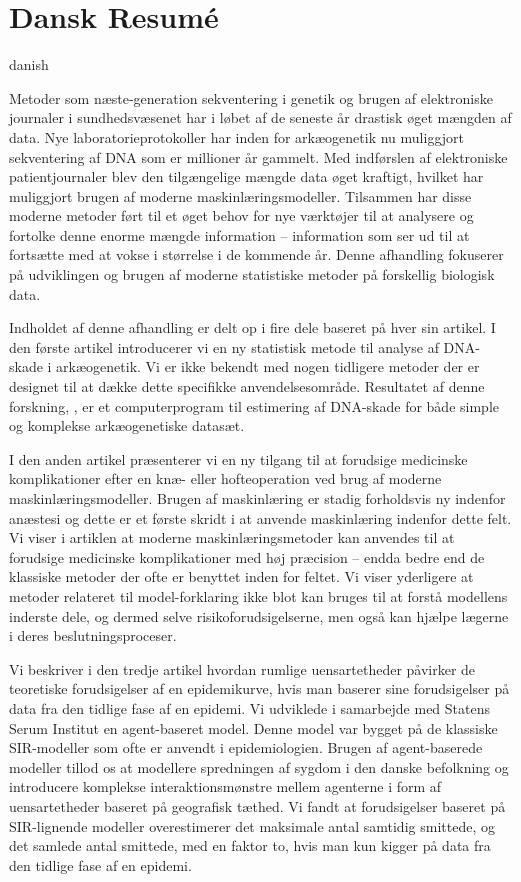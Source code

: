 \chapter{Dansk Resumé}

\begin{otherlanguage*}{danish}


    Metoder som næste-generation sekventering i genetik og brugen af elektroniske journaler i sundhedsvæsenet har i løbet af de seneste år drastisk øget mængden af data. Nye laboratorieprotokoller har inden for arkæogenetik nu muliggjort sekventering af DNA som er millioner år gammelt. Med indførslen af elektroniske patientjournaler blev den tilgængelige mængde data øget kraftigt, hvilket har muliggjort brugen af moderne maskinlæringsmodeller. Tilsammen har disse moderne metoder ført til et øget behov for nye værktøjer til at analysere og fortolke denne enorme mængde information -- information som ser ud til at fortsætte med at vokse i størrelse i de kommende år. Denne afhandling fokuserer på udviklingen og brugen af moderne statistiske metoder på forskellig biologisk data.

    Indholdet af denne afhandling er delt op i fire dele baseret på hver sin artikel. I den første artikel introducerer vi en ny statistisk metode til analyse af DNA-skade i arkæogenetik. Vi er ikke bekendt med nogen tidligere metoder der er designet til at dække dette specifikke anvendelsesområde. Resultatet af denne forskning, \metaDMG, er et computerprogram til estimering af DNA-skade for både simple og komplekse arkæogenetiske datasæt.

    I den anden artikel præsenterer vi en ny tilgang til at forudsige medicinske komplikationer efter en knæ- eller hofteoperation ved brug af moderne maskinlæringsmodeller. Brugen af maskinlæring er stadig forholdsvis ny indenfor anæstesi og dette er et første skridt i at anvende maskinlæring indenfor dette felt. Vi viser i artiklen at moderne maskinlæringsmetoder kan anvendes til at forudsige medicinske komplikationer med høj præcision -- endda bedre end de klassiske metoder der ofte er benyttet inden for feltet. Vi viser yderligere at metoder relateret til model-forklaring ikke blot kan bruges til at forstå modellens inderste dele, og dermed selve risikoforudsigelserne, men også kan hjælpe lægerne i deres beslutningsproceser.

    Vi beskriver i den tredje artikel hvordan rumlige uensartetheder påvirker de teoretiske forudsigelser af en epidemikurve, hvis man baserer sine forudsigelser på data fra den tidlige fase af en epidemi. Vi udviklede i samarbejde med Statens Serum Institut en agent-baseret model. Denne model var bygget på de klassiske SIR-modeller som ofte er anvendt i epidemiologien. Brugen af agent-baserede modeller tillod os at modellere spredningen af sygdom i den danske befolkning og introducere komplekse interaktionsmønstre mellem agenterne i form af uensartetheder baseret på geografisk tæthed. Vi fandt at forudsigelser baseret på SIR-lignende modeller overestimerer det maksimale antal samtidig smittede, og det samlede antal smittede, med en faktor to, hvis man kun kigger på data fra den tidlige fase af en epidemi.


\end{otherlanguage*}

